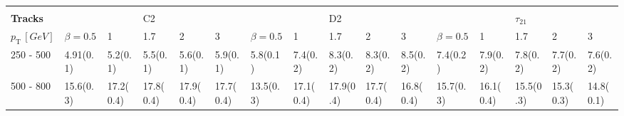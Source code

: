\begin{table}
{\begin{tabular}{llllllllllllllll}
                                    &                                  &                           &                           &                           &                           &                                  &                           &                           &                           &                           &                                  &                           &                           &                           &                           \\
 \multicolumn{1}{l||}{\textbf{Tracks}}         &                                  &                           & C2                        &                           & \multicolumn{1}{l|}{}     &                                  &                           & D2                        &                           & \multicolumn{1}{l|}{}     &                                  &                           & $\tau_{21}$               &                           & \multicolumn{1}{l|}{}     \\ \hline
\multicolumn{1}{l||}{$p_{\mathrm{T}} \, [GeV]$} & \multicolumn{1}{l|}{$\beta=0.5$} & \multicolumn{1}{l|}{1}    & \multicolumn{1}{l|}{1.7}  & \multicolumn{1}{l|}{2}    & \multicolumn{1}{l||}{3}    & \multicolumn{1}{l|}{$\beta=0.5$} & \multicolumn{1}{l|}{1}    & \multicolumn{1}{l|}{1.7}  & \multicolumn{1}{l|}{2}    & \multicolumn{1}{l||}{3}    & \multicolumn{1}{l|}{$\beta=0.5$} & \multicolumn{1}{l|}{1}    & \multicolumn{1}{l|}{1.7}  & \multicolumn{1}{l|}{2}    & \multicolumn{1}{l|}{3}    \\ \hline \hline
\multicolumn{1}{l||}{250 - 500}      & \multicolumn{1}{l|}{4.91(0.1)}       & \multicolumn{1}{l|}{5.2(0.1)}  		& \multicolumn{1}{l|}{5.5(0.1)}  		& \multicolumn{1}{l|}{5.6(0.1)}  								& \multicolumn{1}{l||}{5.9(0.1)}  					    & \multicolumn{1}{l|}{5.8(0.1)}         	& \multicolumn{1}{l|}{7.4(0.2)}  	& \multicolumn{1}{l|}{8.3(0.2)} 				 		& \multicolumn{1}{l|}{8.3(0.2)}  					& \multicolumn{1}{l||}{8.5(0.2)}  	& \multicolumn{1}{l|}{7.4(0.2)}         & \multicolumn{1}{l|}{7.9(0.2)}  	& \multicolumn{1}{l|}{7.8(0.2)}  	& \multicolumn{1}{l|}{7.7(0.2)}  	& \multicolumn{1}{l|}{7.6(0.2)}  \\
\multicolumn{1}{l||}{500 - 800}      & \multicolumn{1}{l|}{15.6(0.3)}        & \multicolumn{1}{l|}{17.2(0.4)} 		& \multicolumn{1}{l|}{17.8(0.4)} 		& \multicolumn{1}{l|}{17.9(0.4)} 				& \multicolumn{1}{l||}{17.7(0.4)} 						& \multicolumn{1}{l|}{13.5(0.3)}        	& \multicolumn{1}{l|}{17.1(0.4)} 	& \multicolumn{1}{l|}{17.9(0.4)}		& \multicolumn{1}{l|}{17.7(0.4)} 					& \multicolumn{1}{l||}{16.8(0.4)} 						& \multicolumn{1}{l|}{15.7(0.3)}        & \multicolumn{1}{l|}{16.1(0.4)} 	& \multicolumn{1}{l|}{15.5(0.3)} 	& \multicolumn{1}{l|}{15.3(0.3)} 	& \multicolumn{1}{l|}{14.8(0.1)} \\

\end{tabular}}
\end{table}
